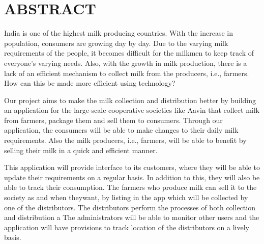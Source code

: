 \chapter*{\uppercase{ABSTRACT}}
India is one of the highest milk producing countries. With the increase in population, consumers are growing day by day. Due to the varying milk requirements of the people, it becomes difficult for the milkmen to keep track of everyone’s varying needs. Also, with the growth in milk production, there is a lack of an efficient mechanism to collect milk from the producers, i.e., farmers. How can this be made more efficient using technology?

Our project aims to make the milk collection and distribution better by building an
application for the large-scale cooperative societies like Aavin that collect milk from
farmers, package them and sell them to consumers. Through our application, the
consumers will be able to make changes to their daily milk requirements. Also the milk
producers, i.e., farmers, will be able to benefit by selling their milk in a quick and efficient
manner.

This  application will provide interface to its customers, where they will be able to update their requirements on a regular basis. In addition to this, they will also be able to track their consumption. The farmers who produce milk can sell it to the society as and when theywant, by listing in the app which will be collected by one of the distributors. The distributors perform the processes of both collection and distribution a The administrators will be able to monitor other users and the application will have provisions to track location of the distributors on a lively basis. 